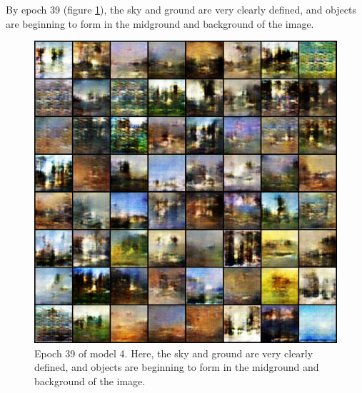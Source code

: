 \documentclass[11pt,letterpaper]{article}
\begin{document}
				By epoch 39 (figure \ref{fig:wa64:epoch039generator}), the sky and ground are very clearly defined, and objects are beginning to form in the midground and background of the image.
				\begin{figure}
					\centering
					\includegraphics[width=1.0\linewidth]{results/model4/epoch039_generator}
					\caption{Epoch 39 of model 4. Here, the sky and ground are very clearly defined, and objects are beginning to form in the midground and background of the image.}
					\label{fig:wa64:epoch039generator}
				\end{figure}
\end{document}
